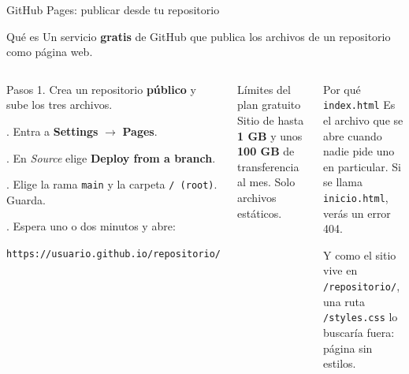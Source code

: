 \documentclass[aspectratio=169,10pt,c]{beamer}
\begin{document}
\begin{frame}{GitHub Pages: publicar desde tu repositorio}
\begin{block}{Qué es}
\small Un servicio \textbf{gratis} de GitHub que publica los archivos de un repositorio como página web.
\end{block}
\begin{columns}[T,onlytextwidth]
\begin{exampleblock}{Pasos}
\small
1. Crea un repositorio \textbf{público} y sube los tres archivos.\par{}. Entra a \textbf{Settings} $\rightarrow$ \textbf{Pages}.\par{}. En \emph{Source} elige \textbf{Deploy from a branch}.\par{}. Elige la rama \texttt{main} y la carpeta \texttt{/ (root)}. Guarda.\par{}. Espera uno o dos minutos y abre:\par
\hspace{3mm}\texttt{https://usuario.github.io/repositorio/}
\end{exampleblock}
\begin{block}{Límites del plan gratuito}
\small Sitio de hasta \textbf{1 GB} y unos \textbf{100 GB} de transferencia al mes. Solo archivos estáticos.
\end{block}
\begin{alertblock}{Por qué \texttt{index.html}}
\small Es el archivo que se abre cuando nadie pide uno en particular. Si se llama \texttt{inicio.html}, verás un error 404.\par\smallskip
Y como el sitio vive en \texttt{/repositorio/}, una ruta \texttt{/styles.css} lo buscaría fuera: página sin estilos.
\end{alertblock}
\end{columns}
\end{frame}
\end{document}
